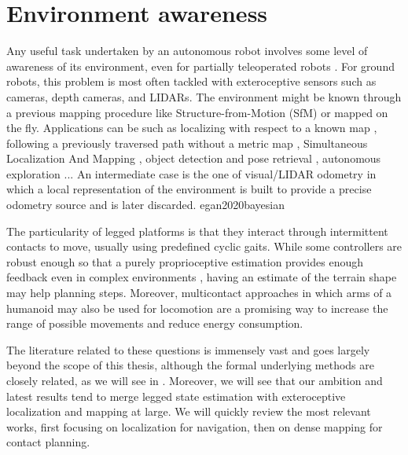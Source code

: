 \section{Environment awareness}
Any useful task undertaken by an autonomous robot involves some level of awareness of its environment, even for partially teleoperated robots \cite{koolen2016design}. 
For ground robots, this problem is most often tackled with exteroceptive sensors such as cameras, depth cameras, and LIDARs.
The environment might be known through a previous mapping procedure like Structure-from-Motion (SfM) \cite{triggs1999bundle} or mapped on the fly. 
Applications can be such as localizing with respect to a known map \cite{dellaert1999monte},
following a previously traversed path without a metric map \cite{furgale2010visual}, Simultaneous Localization And Mapping 
\cite{aulinas2008slam, cadena2016past}, object detection and pose retrieval \cite{du2021vision}, autonomous exploration \cite{rouvcek2019darpa, kulkarni2021autonomous}... 
An intermediate case is the one of visual/LIDAR odometry in which a local representation of the environment is built to provide a 
precise odometry source \cite{scaramuzza2011visual} and is later discarded. 
e{gan2020bayesian}


The particularity of legged platforms is that they interact through intermittent contacts to move, usually using predefined cyclic gaits. While some controllers are 
robust enough so that a purely proprioceptive estimation provides enough feedback even in complex environments \cite{tan2018sim, lee2020learning}, having an estimate of 
the terrain shape may help planning steps. Moreover, multicontact approaches \cite{carpentier2017multi, henze2017multi} in which arms of a humanoid may also be used 
for locomotion are a promising way to increase the range of possible movements and reduce energy consumption. 

The literature related to these questions is immensely vast and goes largely beyond the scope of this thesis, although the formal underlying methods are closely related,
as we will see in . Moreover, we will see that our ambition and latest results tend to merge legged state estimation with
exteroceptive localization and mapping at large. We will quickly review the most relevant works, first focusing on localization \eg for navigation, then 
on dense mapping for contact planning. 

